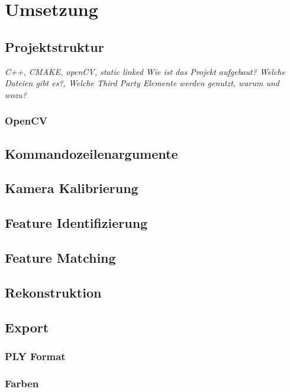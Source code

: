 
\chapter{Umsetzung}
\section{Projektstruktur}
\emph{C++, CMAKE, openCV, static linked}
\emph{Wie ist das Projekt aufgebaut? Welche Dateien gibt es?, Welche Third Party Elemente werden genutzt, warum und wozu?}
\subsection{OpenCV}

\section{Kommandozeilenargumente}

\section{Kamera Kalibrierung}

\section{Feature Identifizierung}

\section{Feature Matching}

\section{Rekonstruktion}

\section{Export}
\subsection{PLY Format}
\subsection{Farben}